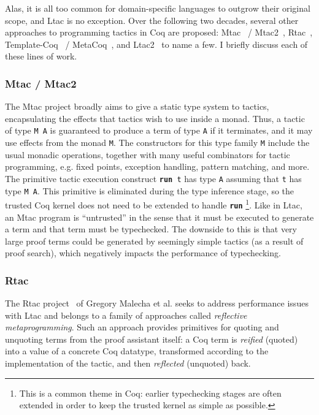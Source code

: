 Alas, it is all too common for domain-specific languages to outgrow their
original scope, and Ltac is no exception.
Over the following two decades, several other approaches to programming
tactics in Coq are proposed:
Mtac~\cite{mtac-journal} / Mtac2~\cite{mtac2}, Rtac~\cite{rtac},
Template-Coq~\cite{template-coq} / MetaCoq~\cite{metacoq}, and
Ltac2~\cite{ltac2} to name a few.
I briefly discuss each of these lines of work.

\subsubsection{Mtac / Mtac2}

\newcommand{\trun}{{\bfseries run}}
The Mtac project broadly aims to give a static type system to tactics,
encapsulating the effects that tactics wish to use inside a monad.
Thus, a tactic of type \texttt{M A} is guaranteed to produce a term of type
\texttt{A} if it terminates, and it may use effects from the monad \texttt{M}.
The constructors for this type family \texttt{M} include the usual monadic
operations, together with many useful combinators for tactic programming,
e.g. fixed points, exception handling, pattern matching, and more.
The primitive tactic execution construct \texttt{\trun{} t} has type
\texttt{A} assuming that \texttt{t} has type \texttt{M A}.
This primitive is eliminated during the type inference stage, so the trusted Coq
kernel does not need to be extended to handle \texttt{\trun}%
\footnote{%
  This is a common theme in Coq: earlier typechecking stages are often extended
  in order to keep the trusted kernel as simple as possible.%
}.
Like in Ltac, an Mtac program is ``untrusted'' in the sense that it must be
executed to generate a term and that term must be typechecked.
The downside to this is that very large proof terms could be generated by
seemingly simple tactics (as a result of proof search), which negatively impacts
the performance of typechecking.

\subsubsection{Rtac}

The Rtac project~\cite{rtac} of Gregory Malecha et al.
seeks to address performance issues with Ltac
and
belongs to a family of approaches called \emph{reflective metaprogramming}.
Such an approach provides primitives for quoting and unquoting terms from the
proof assistant itself: a Coq term is \emph{reified} (quoted) into a value of a
concrete Coq datatype, transformed according to the implementation of the
tactic, and then \emph{reflected} (unquoted) back.

